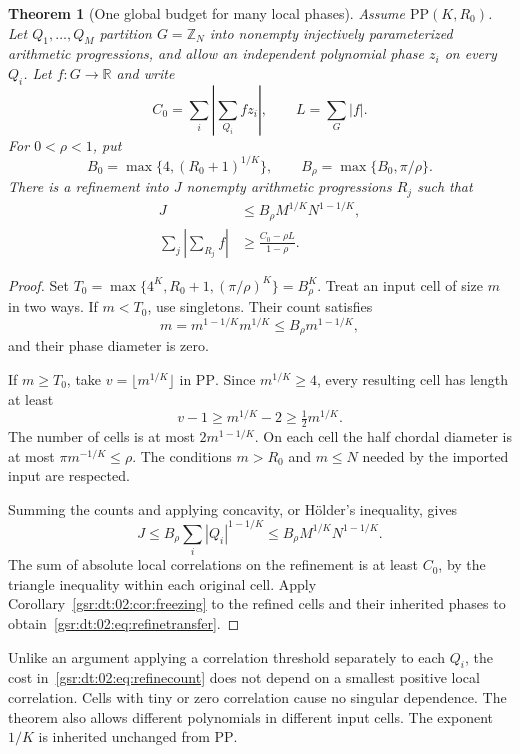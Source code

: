 \documentclass[11pt,letterpaper]{article}
\numberwithin{equation}{section}
\newtheorem{theorem}{Theorem}[section]
\theoremstyle{definition}
\theoremstyle{remark}
\newcommand{\R}{\mathbb R}
\newcommand{\Z}{\mathbb Z}
\newcommand{\1}{\mathbf 1}
\begin{document}
\begin{theorem}[One global budget for many local phases]\label{gsr:dt:02:thm:refine}
Assume $\mathrm{PP}(K,R_0)$. Let $Q_1,\ldots,Q_M$ partition $G=\Z_N$ into nonempty injectively parameterized arithmetic progressions, and allow an independent polynomial phase $z_i$ on every $Q_i$. Let $f:G\to\R$ and write
\[
 C_0=\sum_i\left|\sum_{Q_i}fz_i\right|,\qquad L=\sum_G|f|.
\]
For $0<\rho<1$, put
\begin{equation}\label{gsr:dt:02:eq:Bdef}
 B_0=\max\{4,(R_0+1)^{1/K}\},\qquad
 B_\rho=\max\{B_0,\pi/\rho\}.
\end{equation}
There is a refinement into $J$ nonempty arithmetic progressions $R_j$ such that
\begin{align}
 J&\leq B_\rho M^{1/K}N^{1-1/K},\label{gsr:dt:02:eq:refinecount}\\
 \sum_j\left|\sum_{R_j}f\right|
   &\geq\frac{C_0-\rho L}{1-\rho}.
   \label{gsr:dt:02:eq:refinetransfer}
\end{align}
\end{theorem}
\begin{proof}
Set $T_0=\max\{4^K,R_0+1,(\pi/\rho)^K\}=B_\rho^K$. Treat an input cell of size $m$ in two ways. If $m<T_0$, use singletons. Their count satisfies
\[
 m=m^{1-1/K}m^{1/K}\leq B_\rho m^{1-1/K},
\]
and their phase diameter is zero.

If $m\geq T_0$, take $v=\lfloor m^{1/K}\rfloor$ in $\mathrm{PP}$. Since $m^{1/K}\geq4$, every resulting cell has length at least
\[
 v-1\geq m^{1/K}-2\geq\tfrac12m^{1/K}.
\]
The number of cells is at most $2m^{1-1/K}$. On each cell the half chordal diameter is at most $\pi m^{-1/K}\leq\rho$. The conditions $m>R_0$ and $m\leq N$ needed by the imported input are respected.

Summing the counts and applying concavity, or H\"older's inequality, gives
\[
 J\leq B_\rho\sum_i|Q_i|^{1-1/K}
 \leq B_\rho M^{1/K}N^{1-1/K}.
\]
The sum of absolute local correlations on the refinement is at least $C_0$, by the triangle inequality within each original cell. Apply Corollary~\ref{gsr:dt:02:cor:freezing} to the refined cells and their inherited phases to obtain~\eqref{gsr:dt:02:eq:refinetransfer}.
\end{proof}

Unlike an argument applying a correlation threshold separately to each $Q_i$, the cost in~\eqref{gsr:dt:02:eq:refinecount} does not depend on a smallest positive local correlation. Cells with tiny or zero correlation cause no singular dependence. The theorem also allows different polynomials in different input cells. The exponent $1/K$ is inherited unchanged from $\mathrm{PP}$.
\end{document}
